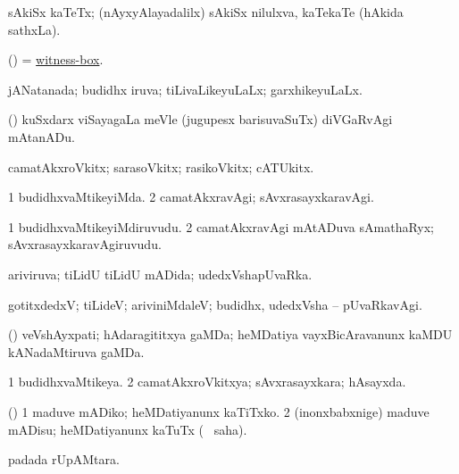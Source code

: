 \bentry
{} 
\gl{\nA}
\expl{}
\bmng
sAkiSx kaTeTx; (nAyxyAlayadalilx) sAkiSx nilulxva, kaTekaTe (hAkida sathxLa). 
\emng
\eentry

\bentry
{} 
\gl{\nA}
\expl{}
\bmng
(\ame) = \hyperlink{witness-box}{witness-box}. 
\emng
\eentry

\bentry
{} 
\gl{\gu}
\expl{}
\bmng
jANatanada; budidhx iruva; tiLivaLikeyuLaLx; garxhikeyuLaLx. 
\emng
\eentry

\bentry
{} 
\gl{\kirx}
\expl{}
\bmng
(\AmA) kuSxdarx viSayagaLa meVle (jugupesx barisuvaSuTx) diVGaRvAgi mAtanADu. 
\emng
\eentry

\bentry
{} 
\gl{\nA}
\expl{}
\bmng
camatAkxroVkitx; sarasoVkitx; rasikoVkitx; cATUkitx. 
\emng
\eentry

\bentry
{} 
\gl{\kirxvi}
\expl{}
\bmng
\bnum
\num{1} budidhxvaMtikeyiMda. 
\num{2} camatAkxravAgi; sAvxrasayxkaravAgi. 
\enum
\emng
\eentry

\bentry
{} 
\gl{\nA}
\expl{}
\bmng
\bnum
\num{1} budidhxvaMtikeyiMdiruvudu. 
\num{2} camatAkxravAgi mAtADuva sAmathaRyx; sAvxrasayxkaravAgiruvudu. 
\enum
\emng
\eentry

\bentry
{} 
\gl{\gu}
\expl{}
\bmng
ariviruva; tiLidU tiLidU mADida; udedxVshapUvaRka. 
\emng
\eentry

\bentry
{} 
\gl{\kirxvi}
\expl{}
\bmng
gotitxdedxV; tiLideV; ariviniMdaleV; budidhx, udedxVsha -- pUvaRkavAgi. 
\emng
\eentry

\bentry
{} 
\gl{\nA}
\expl{}
\bmng
(\pArxparx) veVshAyxpati; hAdaragititxya gaMDa; heMDatiya vayxBicAravanunx kaMDU kANadaMtiruva gaMDa. 
\emng
\eentry

\bentry
{} 
\gl{\gu}
\bmng
\bnum
\num{1} budidhxvaMtikeya. 
\num{2} camatAkxroVkitxya; sAvxrasayxkara; hAsayxda. 
\enum
\emng
\eentry

\bentry
{} 
\gl{\akirx}
\expl{}
\bmng
(\pArxparx) 
\bnum
\num{1} maduve mADiko; heMDatiyanunx kaTiTxko. 
\num{2} (inonxbabxnige) maduve mADisu; heMDatiyanunx kaTuTx ( \akirx\ saha). 
\enum
\emng
\eentry

\bentry
{} 
\gl{\nA}
\expl{}
\bmng
{} padada rUpAMtara. 
\emng
\eentry

